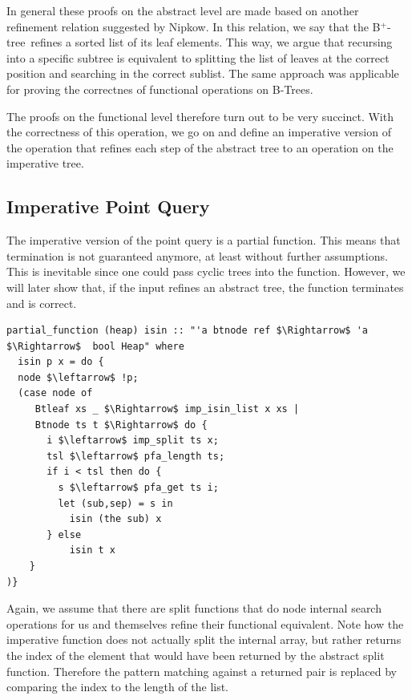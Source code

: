 \documentclass[a4paper,UKenglish,cleveref, autoref, thm-restate]{lipics-v2021}
\newcommand{\btree}{B$^+$-tree}
\begin{document}
In general these proofs on the abstract level are made
based on another refinement relation suggested by Nipkow. \cite{DBLP:conf/itp/Nipkow16}
In this relation, we say that the \btree\ refines a sorted list of its leaf elements.
This way, we argue that recursing into a specific subtree
is equivalent to splitting the list of leaves at the correct position
and searching in the correct sublist.
The same approach was applicable for proving the correctnes of functional
operations on B-Trees. \cite{DBLP:journals/afp/Mundler21}

The proofs on the functional level therefore turn out to be very succinct.
With the correctness of this operation,
we go on and define an imperative version of the operation that
refines each step of the abstract tree to an operation on the imperative tree.

\subsection{Imperative Point Query}
\label{sec:imperative_pq}

The imperative version of the point query is a partial function.
This means that termination is not guaranteed anymore,
at least without further assumptions.
This is inevitable since one could pass cyclic trees into the function.
However, we will later show that, if the input refines an abstract tree,
the function terminates and is correct.

\begin{lstlisting}[mathescape=true, language=Isabelle,label=lst:isin-imp-def]
partial_function (heap) isin :: "'a btnode ref $\Rightarrow$ 'a $\Rightarrow$  bool Heap" where
  isin p x = do {
  node $\leftarrow$ !p;
  (case node of
     Btleaf xs _ $\Rightarrow$ imp_isin_list x xs |
     Btnode ts t $\Rightarrow$ do {
       i $\leftarrow$ imp_split ts x;
       tsl $\leftarrow$ pfa_length ts;
       if i < tsl then do {
         s $\leftarrow$ pfa_get ts i;
         let (sub,sep) = s in
           isin (the sub) x
       } else
           isin t x
    }
)}
\end{lstlisting}

Again, we assume that there are split functions that do node internal search operations for us
and themselves refine their functional equivalent.
Note how the imperative function does not actually split
the internal array, but rather returns the index of the element
that would have been returned by the abstract split function.
Therefore the pattern matching against a returned pair
is replaced by comparing the index to the length of the list.
\end{document}
